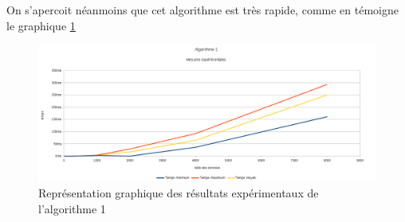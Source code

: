 On s'apercoit néanmoins que cet algorithme est très rapide, comme en témoigne le graphique \ref{graphalgo1}
\begin{figure}[p]
  \includegraphics[width=\textwidth]{expe_algo1}
  \caption{Représentation graphique des résultats expérimentaux de l'algorithme 1}
    \label{graphalgo1}
\end{figure}

